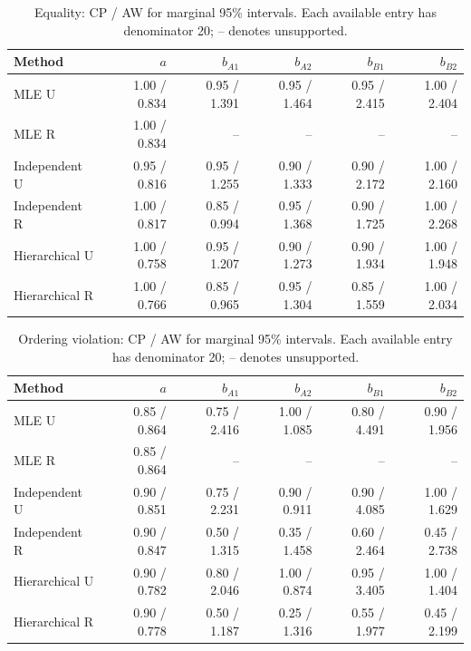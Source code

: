 \begin{table}[htbp]\centering\scriptsize

\caption{Equality: CP / AW for marginal 95\% intervals. Each available entry has denominator 20; -- denotes unsupported.}

\begin{tabular}{lrrrrr}\hline Method & $a$ & $b_{A1}$ & $b_{A2}$ & $b_{B1}$ & $b_{B2}$\\\hline

MLE U & 1.00 / 0.834 & 0.95 / 1.391 & 0.95 / 1.464 & 0.95 / 2.415 & 1.00 / 2.404\\

MLE R & 1.00 / 0.834 & -- & -- & -- & --\\

Independent U & 0.95 / 0.816 & 0.95 / 1.255 & 0.90 / 1.333 & 0.90 / 2.172 & 1.00 / 2.160\\

Independent R & 1.00 / 0.817 & 0.85 / 0.994 & 0.95 / 1.368 & 0.90 / 1.725 & 1.00 / 2.268\\

Hierarchical U & 1.00 / 0.758 & 0.95 / 1.207 & 0.90 / 1.273 & 0.90 / 1.934 & 1.00 / 1.948\\

Hierarchical R & 1.00 / 0.766 & 0.85 / 0.965 & 0.95 / 1.304 & 0.85 / 1.559 & 1.00 / 2.034\\

\hline\end{tabular}\end{table}

\begin{table}[htbp]\centering\scriptsize

\caption{Ordering violation: CP / AW for marginal 95\% intervals. Each available entry has denominator 20; -- denotes unsupported.}

\begin{tabular}{lrrrrr}\hline Method & $a$ & $b_{A1}$ & $b_{A2}$ & $b_{B1}$ & $b_{B2}$\\\hline

MLE U & 0.85 / 0.864 & 0.75 / 2.416 & 1.00 / 1.085 & 0.80 / 4.491 & 0.90 / 1.956\\

MLE R & 0.85 / 0.864 & -- & -- & -- & --\\

Independent U & 0.90 / 0.851 & 0.75 / 2.231 & 0.90 / 0.911 & 0.90 / 4.085 & 1.00 / 1.629\\

Independent R & 0.90 / 0.847 & 0.50 / 1.315 & 0.35 / 1.458 & 0.60 / 2.464 & 0.45 / 2.738\\

Hierarchical U & 0.90 / 0.782 & 0.80 / 2.046 & 1.00 / 0.874 & 0.95 / 3.405 & 1.00 / 1.404\\

Hierarchical R & 0.90 / 0.778 & 0.50 / 1.187 & 0.25 / 1.316 & 0.55 / 1.977 & 0.45 / 2.199\\

\hline\end{tabular}\end{table}

